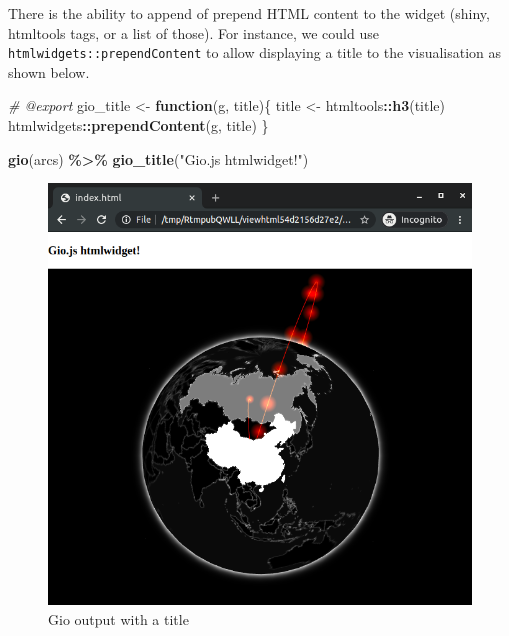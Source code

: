 \documentclass[
]{krantz}
\makeatletter
\newenvironment{Shaded}{\begin{snugshade}}{\end{snugshade}}
\newcommand{\CommentTok}[1]{\textcolor[rgb]{0.37,0.37,0.37}{\textit{#1}}}
\newcommand{\ControlFlowTok}[1]{\textcolor[rgb]{0.27,0.27,0.27}{\textbf{#1}}}
\newcommand{\KeywordTok}[1]{\textcolor[rgb]{0.27,0.27,0.27}{\textbf{#1}}}
\newcommand{\NormalTok}[1]{#1}
\newcommand{\OperatorTok}[1]{\textcolor[rgb]{0.43,0.43,0.43}{\textbf{#1}}}
\newcommand{\StringTok}[1]{\textcolor[rgb]{0.5,0.5,0.5}{#1}}
\newenvironment{kframe}{%
\medskip{}
\setlength{\fboxsep}{.8em}
 \def\at@end@of@kframe{}%
 \ifinner\ifhmode%
  \def\at@end@of@kframe{\end{minipage}}%
  \begin{minipage}{\columnwidth}%
 \fi\fi%
 \def\FrameCommand##1{\hskip\@totalleftmargin \hskip-\fboxsep
 \colorbox{shadecolor}{##1}\hskip-\fboxsep
     \hskip-\linewidth \hskip-\@totalleftmargin \hskip\columnwidth}%
 \MakeFramed {\advance\hsize-\width
   \@totalleftmargin\z@ \linewidth\hsize
   \@setminipage}}%
 {\par\unskip\endMakeFramed%
 \at@end@of@kframe}
\renewenvironment{Shaded}{\begin{kframe}}{\end{kframe}}
\makeatother
\begin{document}
There is the ability to append of prepend HTML content to the widget (shiny, htmltools tags, or a list of those). For instance, we could use \texttt{htmlwidgets::prependContent} to allow displaying a title to the visualisation as shown below.

\begin{Shaded}
\begin{Highlighting}[]
\CommentTok{\#\textquotesingle{} @export}
\NormalTok{gio\_title \textless{}{-}}\StringTok{ }\ControlFlowTok{function}\NormalTok{(g, title)\{}
\NormalTok{  title \textless{}{-}}\StringTok{ }\NormalTok{htmltools}\OperatorTok{::}\KeywordTok{h3}\NormalTok{(title)}
\NormalTok{  htmlwidgets}\OperatorTok{::}\KeywordTok{prependContent}\NormalTok{(g, title)}
\NormalTok{\}}
\end{Highlighting}
\end{Shaded}

\begin{Shaded}
\begin{Highlighting}[]
\KeywordTok{gio}\NormalTok{(arcs) }\OperatorTok{\%\textgreater{}\%}\StringTok{ }
\StringTok{  }\KeywordTok{gio\_title}\NormalTok{(}\StringTok{"Gio.js htmlwidget!"}\NormalTok{)}
\end{Highlighting}
\end{Shaded}

\begin{figure}
\centering
\includegraphics{images/gio-title.png}
\caption{Gio output with a title}
\end{figure}
\end{document}
